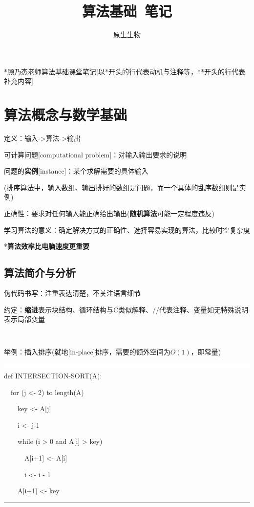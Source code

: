 \documentclass[a4paper,UTF8,fontset=windows]{ctexart}
\title{\textbf{算法基础\ 笔记}}
\author{原生生物}
\date{}
\newenvironment{code}{\rule{36em}{0.1em}\setlength{\parindent}{1em}

}{

\setlength{\parindent}{0em}\rule{36em}{0.1em}}
\begin{document}
\maketitle

*\hspace{0em}顾乃杰老师算法基础课堂笔记[以*开头的行代表动机与注释等，**开头的行代表补充内容]

\tableofcontents

\newpage

\section{算法概念与数学基础}
定义：输入->算法->输出

可计算问题[computational problem]：对输入输出要求的说明

问题的\textbf{实例}[instance]：某个求解需要的具体输入

(排序算法中，输入数组、输出排好的数组是问题，而一个具体的乱序数组则是实例)

正确性：要求对任何输入能正确给出输出(\textbf{随机算法}可能一定程度违反)

学习算法的意义：确定解决方式的正确性、选择容易实现的算法，比较时空复杂度

*\hspace{0em}\textbf{算法效率比电脑速度更重要}

\subsection{算法简介与分析}

伪代码书写：注重表达清楚，不关注语言细节

约定：\textbf{缩进}表示块结构、循环结构与C类似解释、//代表注释、变量如无特殊说明表示局部变量

\

举例：插入排序(就地[in-place]排序，需要的额外空间为$O(1)$，即常量)

\begin{code}
def INTERSECTION-SORT(A):

\ \ for (j <- 2) to length(A)

\ \ \ \ key <- A[j]

\ \ \ \ i <- j-1

\ \ \ \ while (i > 0 and A[i] > key)

\ \ \ \ \ \ A[i+1] <- A[i]

\ \ \ \ \ \ i <- i - 1

\ \ \ \  A[i+1] <- key
\end{code}
\end{document}
